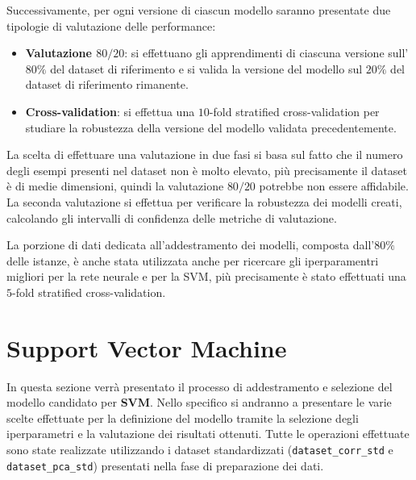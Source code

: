 Successivamente, per ogni versione di ciascun modello saranno presentate due
tipologie di valutazione delle performance:
\begin{itemize}
    \item \textbf{Valutazione $80/20$}: si effettuano gli apprendimenti di
          ciascuna versione sull'$80\%$ del dataset di riferimento e si valida
          la versione del modello sul $20\%$ del dataset di riferimento rimanente.
    \item \textbf{Cross-validation}: si effettua una $10$-fold stratified
          cross-validation per studiare la robustezza della versione del modello
          validata precedentemente.
\end{itemize}
La scelta di effettuare una valutazione in due fasi si basa sul fatto che il
numero degli esempi presenti nel dataset non è molto elevato, più precisamente
il dataset è di medie dimensioni, quindi la valutazione $80/20$ potrebbe non
essere affidabile. La seconda valutazione si effettua per verificare la
robustezza dei modelli creati, calcolando gli intervalli di confidenza delle
metriche di valutazione.

La porzione di dati dedicata all'addestramento dei modelli, composta dall'$80\%$
delle istanze, è anche stata utilizzata anche per ricercare gli iperparamentri
migliori per la rete neurale e per la SVM, più precisamente è stato effettuati
una $5$-fold stratified cross-validation.

\section{Support Vector Machine}
In questa sezione verrà presentato il processo di addestramento e selezione del
modello candidato per \textbf{SVM}. Nello specifico si andranno a presentare le
varie scelte effettuate per la definizione del modello tramite la selezione
degli iperparametri e la valutazione dei risultati ottenuti. Tutte le operazioni
effettuate sono state realizzate utilizzando i dataset standardizzati
(\texttt{dataset\_corr\_std} e \texttt{dataset\_pca\_std}) presentati nella fase
di preparazione dei dati.

